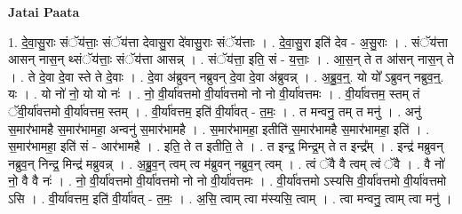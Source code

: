 \documentclass[17pt]{extarticle}
\begin{document}
\textbf{Jatai Paata} \newline

1. दे॒वा॒सु॒राः संॅय॑त्ताः॒ संॅय॑त्ता देवासु॒रा दे॑वासु॒राः संॅय॑त्ताः । . दे॒वा॒सु॒रा इति॑ देव - अ॒सु॒राः । . संॅय॑त्ता आसन् नास॒न् थ्संॅय॑त्ताः॒ संॅय॑त्ता आसन्न् । . संॅय॑त्ता॒ इति॒ सं - य॒त्ताः॒ । . आ॒स॒न् ते त आ॑सन् नास॒न् ते । . ते दे॒वा दे॒वा स्ते ते दे॒वाः । . दे॒वा अ॑ब्रुवन् नब्रुवन् दे॒वा दे॒वा अ॑ब्रुवन्न् । . अ॒ब्रु॒व॒न्॒. यो यो᳚ ऽब्रुवन् नब्रुव॒न्॒. यः । . यो नो॑ नो॒ यो यो नः॑ । . नो॒ वी॒र्या॑वत्तमो वी॒र्या॑वत्तमो नो नो वी॒र्या॑वत्तमः । . वी॒र्या॑वत्तम॒ स्तम् तं ॅवी॒र्या॑वत्तमो वी॒र्या॑वत्तम॒ स्तम् । . वी॒र्या॑वत्तम॒ इति॑ वी॒र्या॑वत् - त॒मः॒ । . त मन्वनु॒ तम् त मनु॑ । . अनु॑ स॒मार॑भामहै स॒मार॑भामहा॒ अन्वनु॑ स॒मार॑भामहै । . स॒मार॑भामहा॒ इतीति॑ स॒मार॑भामहै स॒मार॑भामहा॒ इति॑ । . स॒मार॑भामहा॒ इति॑ सं - आर॑भामहै । . इति॒ ते त इतीति॒ ते । . त इन्द्र॒ मिन्द्र॒म् ते त इन्द्र᳚म् । . इन्द्र॑ मब्रुवन् नब्रुव॒न् निन्द्र॒ मिन्द्र॑ मब्रुवन्न् । . अ॒ब्रु॒व॒न् त्वम् त्व म॑ब्रुवन् नब्रुव॒न् त्वम् । . त्वं ॅवै वै त्वम् त्वं ॅवै । . वै नो॑ नो॒ वै वै नः॑ । . नो॒ वी॒र्या॑वत्तमो वी॒र्या॑वत्तमो नो नो वी॒र्या॑वत्तमः । . वी॒र्या॑वत्तमो ऽस्यसि वी॒र्या॑वत्तमो वी॒र्या॑वत्तमो ऽसि । . वी॒र्या॑वत्तम॒ इति॑ वी॒र्या॑वत् - त॒मः॒ । . अ॒सि॒ त्वाम् त्वा म॑स्यसि॒ त्वाम् । . त्वा मन्वनु॒ त्वाम् त्वा मनु॑ । \newline
\end{document}

